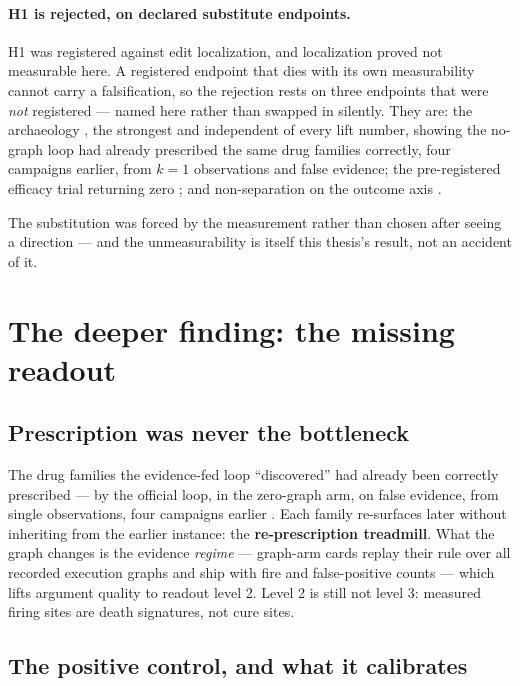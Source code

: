 \paragraph{H1 is rejected, on declared substitute endpoints.} H1 was
registered against edit localization, and localization proved not
measurable here. A registered endpoint that dies with its own measurability
cannot carry a falsification, so the rejection rests on three endpoints
that were \emph{not} registered --- named here rather than swapped in
silently. They are: the archaeology , the strongest and independent
of every lift number, showing the no-graph loop had already prescribed the
same drug families correctly, four campaigns earlier, from $k{=}1$
observations and false evidence; the pre-registered efficacy trial returning
zero ; and non-separation on the outcome axis .

The substitution was forced by the measurement rather than chosen after
seeing a direction --- and the unmeasurability is itself this thesis's
result, not an accident of it.

\section{The deeper finding: the missing readout}
\label{sec:readout}

\subsection*{Prescription was never the bottleneck}

The drug families the evidence-fed loop ``discovered'' had already been
correctly prescribed --- by the official loop, in the zero-graph arm, on
false evidence, from single observations, four campaigns earlier .
Each family re-surfaces later without inheriting from the earlier
instance: the \textbf{re-prescription treadmill}. What the graph changes
is the evidence \emph{regime} --- graph-arm cards replay their rule over
all recorded execution graphs and ship with fire and false-positive
counts --- which lifts argument quality to readout level 2. Level 2 is
still not level 3: measured firing sites are death signatures, not cure
sites.

\subsection*{The positive control, and what it calibrates}

